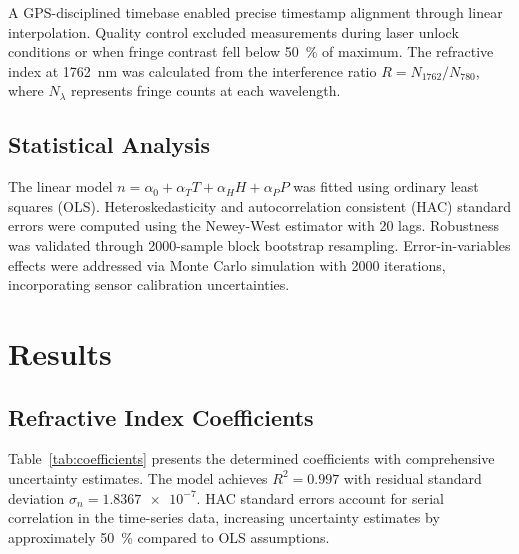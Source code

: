 \documentclass[aps,pra,reprint,groupedaddress,twocolumn,superscriptaddress,linenumbers]{revtex4-2}
\begin{document}
A GPS-disciplined timebase enabled precise timestamp alignment through linear interpolation. Quality control excluded measurements during laser unlock conditions or when fringe contrast fell below \SI{50}{\percent} of maximum. The refractive index at \SI{1762}{\nano\meter} was calculated from the interference ratio $R = N_{1762}/N_{780}$, where $N_\lambda$ represents fringe counts at each wavelength.

\subsection{Statistical Analysis}

The linear model $n = \alpha_0 + \alpha_T T + \alpha_H H + \alpha_P P$ was fitted using ordinary least squares (OLS). Heteroskedasticity and autocorrelation consistent (HAC) standard errors were computed using the Newey-West estimator with \num{20} lags. Robustness was validated through \num{2000}-sample block bootstrap resampling. Error-in-variables effects were addressed via Monte Carlo simulation with \num{2000} iterations, incorporating sensor calibration uncertainties.

\section{Results}

\subsection{Refractive Index Coefficients}

Table~\ref{tab:coefficients} presents the determined coefficients with comprehensive uncertainty estimates. The model achieves $R^2 = 0.997$ with residual standard deviation $\sigma_n = \num{1.8367e-7}$. HAC standard errors account for serial correlation in the time-series data, increasing uncertainty estimates by approximately \SI{50}{\percent} compared to OLS assumptions.
\end{document}
